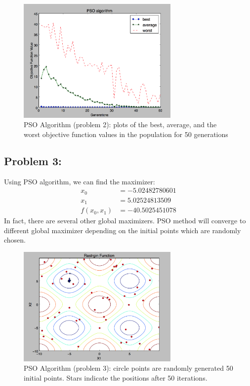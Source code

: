 \documentclass{article}
\begin{document}
\begin{figure}[h]
\includegraphics[width=0.7\textwidth]{PSO_min_best} 
\centering
\caption{PSO Algorithm (problem 2): plots of the best, average, and the worst objective function values in the population for 50 generations }

\end{figure}


\subsection*{{Problem 3: }}

Using PSO algorithm, we can find the maximizer: \\
\begin{align*}
x_0 & =  -5.02482780601\\
x_1 & =  5.02524813509\\
f(x_0,x_1) & = -40.5025451078 
\end{align*}
In fact, there are several other global maximizers. PSO method will converge to different global maximizer depending on the initial points which are randomly chosen.   
\begin{figure}[h]
\includegraphics[width=0.7\textwidth]{PSO_max} 
\centering
\caption{PSO Algorithm (problem 3): circle points are randomly generated 50 initial points. Stars indicate the positions after 50 iterations. }

\end{figure}
\end{document}
